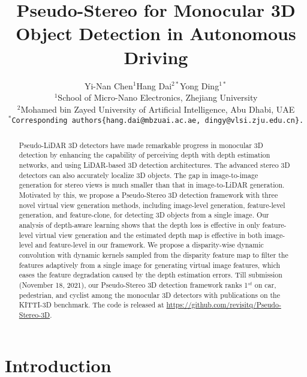\documentclass[10pt,twocolumn,letterpaper]{article}
\begin{document}
\title{Pseudo-Stereo for Monocular 3D Object Detection in Autonomous Driving}


\author{Yi-Nan Chen$^1$\quad Hang Dai$^{2*}$\quad Yong Ding$^{1*}$\\
$^1$School of Micro-Nano Electronics, Zhejiang University\\
$^2$Mohamed bin Zayed University of Artificial Intelligence, Abu Dhabi, UAE
\\
{\tt\small $^*$Corresponding authors\{hang.dai@mbzuai.ac.ae, dingy@vlsi.zju.edu.cn\}.}
}


\maketitle

\begin{abstract}
Pseudo-LiDAR 3D detectors have made remarkable progress in monocular 3D detection by enhancing the capability of perceiving depth with depth estimation networks, and using LiDAR-based 3D detection architectures. The advanced stereo 3D detectors can also accurately localize 3D objects. The gap in image-to-image generation for stereo views is much smaller than that in image-to-LiDAR generation. Motivated by this, we propose a Pseudo-Stereo 3D detection framework with three novel virtual view generation methods, including image-level generation, feature-level generation, and feature-clone, for detecting 3D objects from a single image. Our analysis of depth-aware learning shows that the depth loss is effective in only feature-level virtual view generation and the estimated depth map is effective in both image-level and feature-level in our framework. We propose a disparity-wise dynamic convolution with dynamic kernels sampled from the disparity feature map to filter the features adaptively from a single image for generating virtual image features, which eases the feature degradation caused by the depth estimation errors. Till submission (November 18, 2021), our Pseudo-Stereo 3D detection framework ranks 1$^{st}$ on car, pedestrian, and cyclist among the monocular 3D detectors with publications on the KITTI-3D benchmark. The code is released at \url{https://github.com/revisitq/Pseudo-Stereo-3D}.


\end{abstract}



\vspace{-4mm}
\section{Introduction}
\label{sec:intro}
\end{document}
